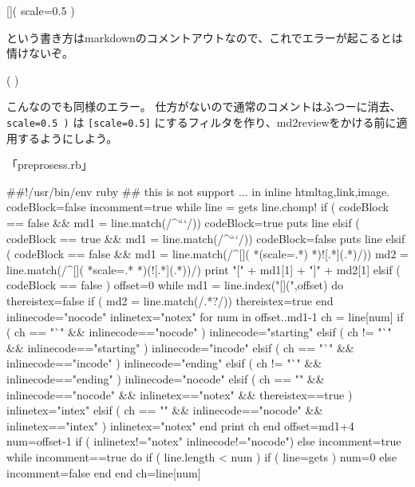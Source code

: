 \begin{reviewemlist}

[]( scale=0.5 )

\end{reviewemlist}

という書き方はmarkdownのコメントアウトなので、これでエラーが起こるとは情けないぞ。

\begin{reviewemlist}
[](
)
\end{reviewemlist}

こんなのでも同様のエラー。
仕方がないので通常のコメントはふつーに消去、\texttt{scale=0.5 )} は \texttt{[scale=0.5]} にするフィルタを作り、md2reviewをかける前に適用するようにしよう。

「preprosess.rb」

\begin{reviewemlist}
\#\#!/usr/bin/env ruby
\#\# this is not support \textdollar{}...\textdollar{} in inline htmltag,link,image.
codeBlock=false
incomment=true
while line = gets
  line.chomp!
  if ( codeBlock == false \&\& md1 = line.match(/\textasciicircum{}```/))
      codeBlock=true
      puts line
  elsif ( codeBlock == true \&\& md1 = line.match(/\textasciicircum{}```/))
      codeBlock=false
      puts line
  elsif ( codeBlock == false \&\& md1 = line.match(/\textasciicircum{}\reviewbackslash{}[\reviewbackslash{}]\reviewbackslash{}(\reviewbackslash{} *(scale=.*)\reviewbackslash{} *\reviewbackslash{})!\reviewbackslash{}[.*\reviewbackslash{}]\reviewbackslash{}(.*\reviewbackslash{})/))
      md2 = line.match(/\textasciicircum{}\reviewbackslash{}[\reviewbackslash{}]\reviewbackslash{}(\reviewbackslash{} *scale=.*\reviewbackslash{} *\reviewbackslash{})(!\reviewbackslash{}[.*\reviewbackslash{}]\reviewbackslash{}(.*\reviewbackslash{}))/)
      print "[" + md1[1] + "]" + md2[1]
  elsif ( codeBlock == false )
    offset=0
    while md1 = line.index("[](",offset) do
      thereistex=false
      if ( md2 = line.match(/\reviewbackslash{}\textdollar{}.*?\reviewbackslash{}\textdollar{}/))
        thereistex=true
      end
      inlinecode="nocode"
      inlinetex="notex"
      for  num in offset..md1{-}1
         ch = line[num]
         if ( ch == "`" \&\& inlinecode=="nocode" )
             inlinecode="starting"
         elsif ( ch != "`" \&\& inlinecode=="starting" )
            inlinecode="incode"
         elsif ( ch == "`" \&\& inlinecode=="incode" )
            inlinecode="ending"
         elsif ( ch != "`" \&\& inlinecode=="ending" )
            inlinecode="nocode"
         elsif ( ch == "\textdollar{}" \&\& inlinecode=="nocode" \&\& inlinetex=="notex" \&\& thereistex==true )
            inlinetex="intex"
         elsif ( ch == "\textdollar{}" \&\& inlinecode=="nocode" \&\& inlinetex=="intex" )
            inlinetex="notex"
         end
         print ch
      end
      offset=md1+4
      num=offset{-}1
      if ( inlinetex!="notex" \textbar{}\textbar{} inlinecode!="nocode")
      else
        incomment=true
        while incomment==true do
          if ( line.length \textless{} num )
            if ( line=gets )
              num=0
            else
              incomment=false
            end
          end
          ch=line[num]


\end{reviewemlist}
